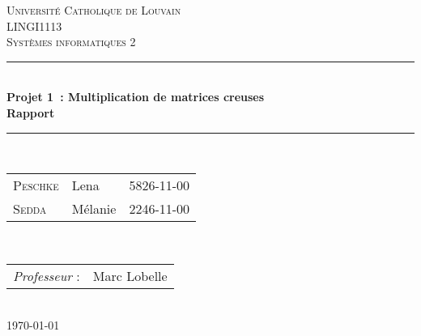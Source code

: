 \documentclass[12pt,a4paper]{article}
\begin{document}
	
\begin{titlepage}
\newcommand{\HRule}{\rule{\linewidth}{0.5mm}} %
\centering %
 
\null
\vspace{2cm}
\textsc{\Large Université Catholique de Louvain}\\[1cm] %
\textsc{\large LINGI1113 \\[0.3cm] Systèmes informatiques 2}\\[0.5cm] %


\HRule \\[0.4cm]
{ \LARGE \bfseries Projet 1~: Multiplication de matrices creuses\\[0.4cm] %
\large \bfseries Rapport} \\[0.4cm]

\HRule \\[0.5cm]
 


\large 
{\begin{tabular}{lll}
\textsc{Peschke} & Lena & 5826-11-00\\
\textsc{Sedda} & Mélanie & 2246-11-00\\
\end{tabular}}
\\[1cm]

\normalsize
{\begin{tabular}{ll}
\textit{Professeur} : & Marc Lobelle \\
\end{tabular}}
\\[1cm]


{\normalsize \today}\\[3cm] %

\newpage

\end{titlepage}
\end{document}
